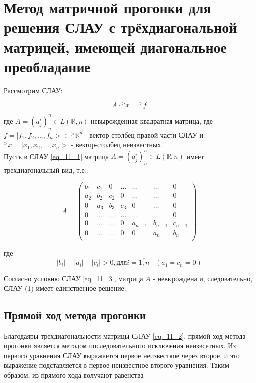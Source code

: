 \documentclass[__main__.tex]{subfiles}
\begin{document}
\section{Метод матричной прогонки для решения СЛАУ с трёхдиагональной матрицей, имеющей диагональное преобладание}

Рассмотрим СЛАУ:

\begin{equation}
\label{eq_11_1}
A \cdot {}^{>}x = {}^{>}f
\end{equation}

где $A = (a^i_j)^n_n \in L(\mathbb{R}, n)$ невырожденная квадратная матрица,
где $f = [f_1, f_2, \text{...}, f_n> \in {}^{>}\mathbb{R}^n$ - вектор-столбец правой части СЛАУ и ${}^{>}x = [x_1, x_2, \text{...}, x_n>$ - вектор-столбец неизвестных.\\

Пусть в СЛАУ \ref{eq_11_1} матрица $A = (a^i_j)^n_n \in L(\mathbb{R}, n)$ имеет трехдиагональный вид, т.е.:

\begin{equation}
\label{eq_11_2}
A = \begin{pmatrix}
b_1 & c_1 & 0 & \hdots & \hdots & \hdots & 0 \\
a_2 & b_2 & c_2 & 0 & \hdots & \hdots & 0 \\
0 & a_3 & b_3 & c_3 & 0 & \hdots & 0 \\
0 & \hdots & \hdots & \hdots & \hdots & \hdots & 0 \\
0 & \hdots & \hdots & 0 & a_{n-1} & b_{n-1} & c_{n - 1}\\
0 & \hdots & \hdots & 0 & 0 & a_n & b_n\\ 
\end{pmatrix}
\end{equation}

где 
\begin{equation}
\label{eq_3_3}
|b_i| - |a_i| - |c_i| > 0, \text{для} i = \overline{1, n} \;\;\; (a_1 = c_n = 0)
\end{equation}

Согласно условию СЛАУ \ref{eq_11_3}, матрица $A$ - невырождена и, следовательно, СЛАУ (1) имеет единственное решение.

\subsection{Прямой ход метода прогонки}

Благодаяры трехдиагональности матрицы СЛАУ \ref{eq_11_2}, прямой ход метода прогонки является методом последовательного исключения неизвсетных. Из  первого уравнения СЛАУ выражается первое неизвестное через второе, и это выражение подставляется в первое неизвестное второго уравнения. Таким образом, из прямого хода получают равенства
\end{document}
